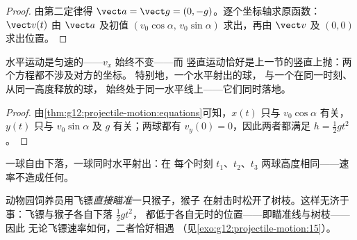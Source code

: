 \begin{proof}
由第二定律得 $\vect a = \vect g = (0,-g)$。逐个坐标轴求原函数：
$\vect v(t)$ 由 $\vect a$ 及初值
$(v_0\cos\alpha,\, v_0\sin\alpha)$ 求出，再由 $\vect v$ 及 $(0,0)$ 求出位置。
\end{proof}

\begin{proposition}[两种运动的独立性]\label{prop:g12:projectile-motion:independence}
水平运动是匀速的——$v_x$ 始终不变——而
竖直运动恰好是上一节的竖直上抛：两个方程都不涉及对方的坐标。
特别地，一个水平射出的球，
与一个在同一时刻、从同一高度释放的球，
始终处于同一水平线上——它们同时落地。
\end{proposition}

\begin{proof}
由\cref{thm:g12:projectile-motion:equations}可知，$x(t)$ 只与
$v_0\cos\alpha$ 有关，$y(t)$ 只与 $v_0\sin\alpha$ 及 $g$ 有关；两球都有
$v_y(0) = 0$，因此两者都满足 $h = \tfrac12 gt^2$。
\end{proof}

\begin{omfigure}

{\small 一球自由下落，一球同时水平射出：在
每个时刻 $t_1$、$t_2$、$t_3$ 两球高度相同——速率不造成任何。}
\end{omfigure}

\begin{remark}[下落的猴子]\label{rem:g12:projectile-motion:monkey}
动物园饲养员用飞镖\emph{直接瞄准}一只猴子，猴子
在射击时松开了树枝。这样无济于事：飞镖与猴子各自下落 $\tfrac12 gt^2$，
都低于各自无时的位置——即瞄准线与树枝——因此
无论飞镖速率如何，二者恰好相遇
（见\cref{exo:g12:projectile-motion:15}）。
\end{remark}

